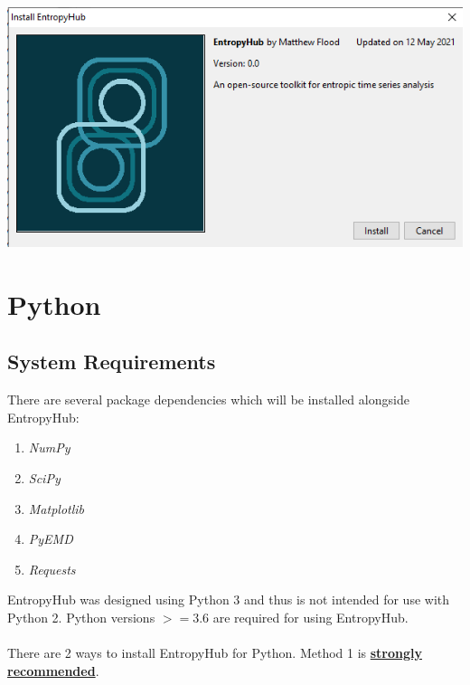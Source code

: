 \documentclass[12pt, a4paper, titlepage, openany]{book}
\begin{document}
\begin{enumerate}
\begin{minipage}[h]{\linewidth}
          \includegraphics[scale=.7]{MATLAB_README2.png}
          \medskip
\end{minipage}
\end{enumerate}


\newpage
\section{\textbf{Python}}
\subsection*{\normalsize System Requirements}
\noindent There are several package dependencies which will be installed alongside EntropyHub: 

\begin{enumerate}
\item[] \emph{NumPy}
\item[] \emph{SciPy}
\item[] \emph{Matplotlib}
\item[] \emph{PyEMD}
\item[] \emph{Requests}
\end{enumerate}  

\noindent EntropyHub was designed using Python 3 and thus is not intended for use with Python 2. Python versions $>= 3.6$ are required for using EntropyHub.  \\ \ \\ 
\noindent There are 2 ways to install EntropyHub for Python. Method 1 is \textbf{\ul{strongly recommended}}.
\end{document}
